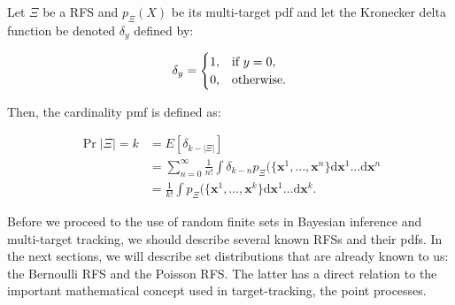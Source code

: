 \begin{definition}\label{def:cardinality-rfs}
    Let $\Xi$ be a RFS and $p_\Xi(X)$ be its multi-target pdf and let the Kronecker delta function be denoted $\delta_y$ defined by:

    \begin{equation}
        \delta_y = \begin{cases}
            1, & \textup{if } y = 0, \\
            0, & \textup{otherwise}.
        \end{cases}
    \end{equation}
    
    Then, the cardinality pmf is defined as:

    \begin{align}
        \Pr{|\Xi| = k}
        &= E[\delta_{k - |\Xi|}] \\
        &= \sum_{n=0}^\infty \frac{1}{n !}
        \int \delta_{k - n}
        p_\Xi(\{\mathbf{x}^1, \ldots, \mathbf{x}^n\}
        \mathrm{d}\mathbf{x}^1 \ldots \mathrm{d}\mathbf{x}^n \\
        &= \frac{1}{k !}
        \int p_\Xi(\{\mathbf{x}^1, \ldots, \mathbf{x}^k\}
        \mathrm{d}\mathbf{x}^1 \ldots \mathrm{d}\mathbf{x}^k.
    \end{align}
\end{definition}

Before we proceed to the use of random finite sets in Bayesian inference and multi-target tracking, we should describe several known RFSs and their pdfs. In the next sections, we will describe set distributions that are already known to us: the Bernoulli RFS and the Poisson RFS. The latter has a direct relation to the important mathematical concept used in target-tracking, the point processes.
